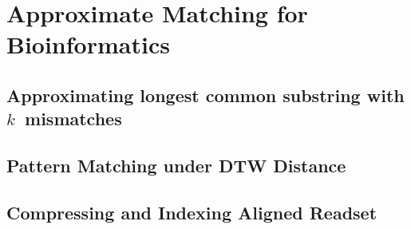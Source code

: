 \part{Approximate Matching for Bioinformatics}

\mainmatter
\chapter{Approximating longest common substring with \texorpdfstring{$k$}{k}~mismatches}\label{chap:LCS}%

\mainmatter
\chapter{Pattern Matching under DTW Distance}\label{chap:DTW}

\mainmatter
\chapter{Compressing and Indexing Aligned Readset}\label{chap:XBWT}
